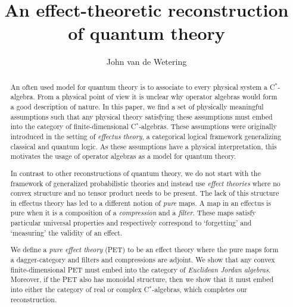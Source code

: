 \documentclass[a4paper,onecolumn,10pt,accepted=2019-05-03, issue=1, volume=1, shorttitle=papers/compositionality-1-1]{compositionalityarticle}
\numberwithin{counter}{section}
\begin{document}
\title{An effect-theoretic reconstruction of quantum theory}
\date{}
\author{John van de Wetering}


\maketitle

\begin{abstract}
An often used model for quantum theory is to associate to every physical system a C$^*$-algebra. From a physical point of view it is unclear why operator algebras would form a good description of nature. In this paper, we find a set of physically meaningful assumptions such that any physical theory satisfying these assumptions must embed into the category of finite-dimensional C$^*$-algebras. These assumptions were originally introduced in the setting of \emph{effectus theory}, a categorical logical framework generalizing classical and quantum logic. As these assumptions have a physical interpretation, this motivates the usage of operator algebras as a model for quantum theory.

In contrast to other reconstructions of quantum theory, we do not start with the framework of generalized probabilistic theories and instead use \emph{effect theories} where no convex structure and no tensor product needs to be present. The lack of this structure in effectus theory has led to a different notion of \emph{pure} maps. A map in an effectus is pure when it is a composition of a \emph{compression} and a \emph{filter}. These maps satisfy particular universal properties and respectively correspond to `forgetting' and `measuring' the validity of an effect.

We define a \emph{pure effect theory} (PET) to be an effect theory where the pure maps form a dagger-category and filters and compressions are adjoint. We show that any convex finite-dimensional PET must embed into the category of \emph{Euclidean Jordan algebras}. Moreover, if the PET also has monoidal structure, then we show that it must embed into either the category of real or complex C$^*$-algebras, which completes our reconstruction. 
\end{abstract}
\end{document}
